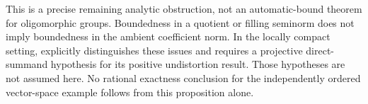 This is a precise remaining analytic obstruction, not an
automatic-bound theorem for oligomorphic groups. Boundedness
in a quotient or filling seminorm does not imply boundedness
in the ambient coefficient norm. In the locally compact
setting, \cite[Propositions~4.2 and 4.4]{ABArora2021} explicitly
distinguishes these issues and requires a projective
direct-summand hypothesis for its positive undistortion result.
Those hypotheses are not assumed here. No rational exactness
conclusion for the independently ordered vector-space example
follows from this proposition alone.


